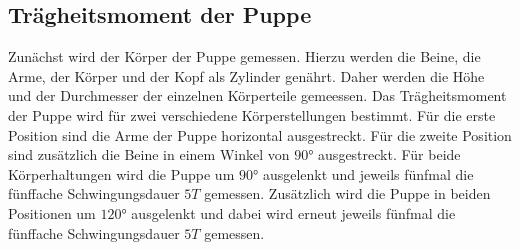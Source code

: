 \subsection{Trägheitsmoment der Puppe}
\label{sec:TragheitPuppe}
%
Zunächst wird der Körper der Puppe gemessen. Hierzu werden die Beine, die Arme, der Körper und der Kopf als Zylinder
genährt. Daher werden die Höhe und der Durchmesser der einzelnen Körperteile gemeessen. Das Trägheitsmoment der Puppe wird 
für zwei verschiedene Körperstellungen bestimmt. Für die erste Position sind die Arme der Puppe horizontal ausgestreckt. 
Für die zweite Position sind zusätzlich die Beine in einem Winkel von $90°$ ausgestreckt. Für beide Körperhaltungen wird 
die Puppe um $90°$ ausgelenkt und jeweils fünfmal die fünffache Schwingungsdauer $5T$ gemessen. Zusätzlich wird die Puppe 
in beiden Positionen um $120°$ ausgelenkt und dabei wird erneut jeweils fünfmal die fünffache Schwingungsdauer $5T$ gemessen. 
%
